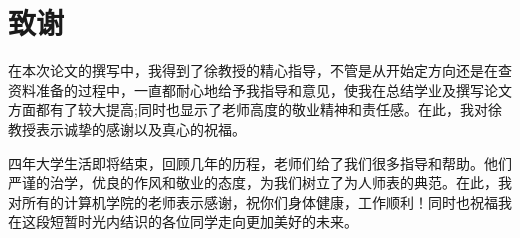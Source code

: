 
\clearpage
{}
{}

\chapter*{致谢}
在本次论文的撰写中，我得到了徐教授的精心指导，不管是从开始定方向还是在查资料准备的过程中，一直都耐心地给予我指导和意见，使我在总结学业及撰写论文方面都有了较大提高;同时也显示了老师高度的敬业精神和责任感。在此，我对徐教授表示诚挚的感谢以及真心的祝福。

四年大学生活即将结束，回顾几年的历程，老师们给了我们很多指导和帮助。他们严谨的治学，优良的作风和敬业的态度，为我们树立了为人师表的典范。在此，我对所有的计算机学院的老师表示感谢，祝你们身体健康，工作顺利！同时也祝福我在这段短暂时光内结识的各位同学走向更加美好的未来。